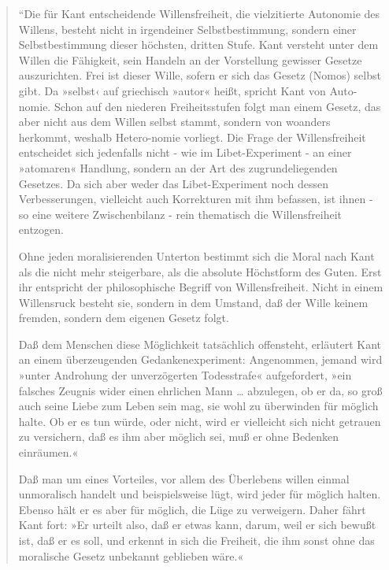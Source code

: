 \documentclass[
  a4paper,
]{report}
\begin{document}
\begin{quote}
``Die für Kant entscheidende Willensfreiheit, die vielzitierte Autonomie des Willens, besteht nicht in irgendeiner Selbstbestimmung, sondern einer Selbstbestimmung dieser höchsten, dritten Stufe. Kant versteht unter dem Willen die Fähigkeit, sein Handeln an der Vorstellung gewisser Gesetze auszurichten. Frei ist dieser Wille, sofern er sich das Gesetz (Nomos) selbst gibt. Da »selbst‹ auf griechisch »autor« heißt, spricht Kant von Auto-nomie. Schon auf den niederen Freiheitsstufen folgt man einem Gesetz, das aber nicht aus dem Willen selbst stammt, sondern von woanders herkommt, weshalb Hetero-nomie vorliegt. Die Frage der Willensfreiheit entscheidet sich jedenfalls nicht - wie im Libet-Experiment - an einer »atomaren« Handlung, sondern an der Art des zugrundeliegenden Gesetzes. Da sich aber weder das Libet-Experiment noch dessen Verbesserungen, vielleicht auch Korrekturen mit ihm befassen, ist ihnen - so eine weitere Zwischenbilanz - rein thematisch die Willensfreiheit entzogen.

Ohne jeden moralisierenden Unterton bestimmt sich die Moral nach Kant als die nicht mehr steigerbare, als die absolute Höchstform des Guten. Erst ihr entspricht der philosophische Begriff von Willensfreiheit. Nicht in einem Willensruck besteht sie, sondern in dem Umstand, daß der Wille keinem fremden, sondern dem eigenen Gesetz folgt.

Daß dem Menschen diese Möglichkeit tatsächlich offensteht, erläutert Kant an einem überzeugenden Gedankenexperiment: Angenommen, jemand wird »unter Androhung der unverzögerten Todesstrafe« aufgefordert, »ein falsches Zeugnis wider einen ehrlichen Mann \ldots{} abzulegen, ob er da, so groß auch seine Liebe zum Leben sein mag, sie wohl zu überwinden für möglich halte. Ob er es tun würde, oder nicht, wird er vielleicht sich nicht getrauen zu versichern, daß es ihm aber möglich sei, muß er ohne Bedenken einräumen.«

Daß man um eines Vorteiles, vor allem des Überlebens willen einmal unmoralisch handelt und beispielsweise lügt, wird jeder für möglich halten. Ebenso hält er es aber für möglich, die Lüge zu verweigern. Daher fährt Kant fort: »Er urteilt also, daß er etwas kann, darum, weil er sich bewußt ist, daß er es soll, und erkennt in sich die Freiheit, die ihm sonst ohne das moralische Gesetz unbekannt geblieben wäre.«


\end{quote}
\end{document}
